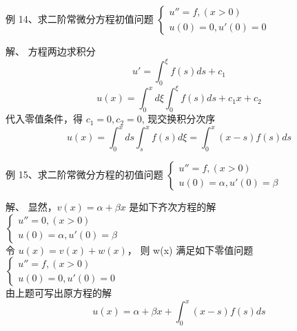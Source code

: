 \begin{frame}
\begin{exampleblock} {例 14、求二阶常微分方程初值问题}
	$\begin{cases}
		u'' =f, (x>0)\\
		u(0)=0, u'(0)=0
	\end{cases}$
	\end{exampleblock}
	\alert{解、} 方程两边求积分
	\begin{equation*}
		u'=\int_{0}^{\xi} f(s) ds +c_1
	\end{equation*}
	\begin{equation*}
		u(x)=\int_{0}^{x}   d\xi  \int_{0}^{\xi} f(s) ds +c_1x  +c_2
	\end{equation*}
	代入零值条件，得  $c_1=0, c_2=0$, 现交换积分次序\\
	\begin{equation*}
		u(x)=\int_{0}^{x}   ds  \int_{s}^{x} f(s) d\xi = \int_{0}^{x}  (x-s)f(s) ds 
	\end{equation*}      
\end{frame}

\begin{frame}
	\begin{exampleblock} {例 15、求二阶常微分方程的初值问题}
	$\begin{cases}
		u'' =f, (x>0)\\
		u(0)=\alpha, u'(0)=\beta
	\end{cases}$
	\end{exampleblock}
	\alert{解、}  显然，$v(x)=\alpha+\beta x$ 是如下齐次方程的解\\
		$\begin{cases}
			u'' =0, (x>0)\\
			u(0)=\alpha, u'(0)=\beta
		\end{cases}$\\
		令 $u(x)=v(x)+w(x)$， 则 w(x) 满足如下零值问题\\	
		$\begin{cases}
			u'' =f, (x>0)\\
			u(0)=0, u'(0)=0
		\end{cases}$\\	  
		由上题可写出原方程的解\\
		\begin{equation*}
			u(x)=\alpha+\beta x + \int_{0}^{x} (x-s)f(s) ds 
		\end{equation*}      
\end{frame}

